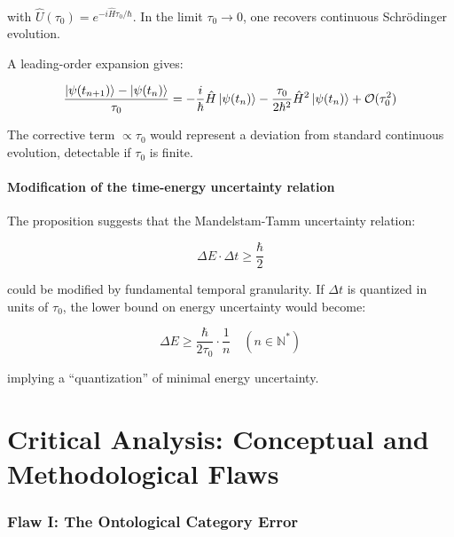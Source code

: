 \documentclass[11pt,a4paper]{article}
\begin{document}
with $\hat{U}(\tau_0) = e^{-i\hat{H}\tau_0/\hbar}$. In the limit $\tau_0 \to 0$, one recovers continuous Schrödinger evolution.

A leading-order expansion gives:

\begin{equation}\label{eq:discrete_expansion}
\frac{\ket{\psi(t_{n+1})} - \ket{\psi(t_n)}}{\tau_0} = -\frac{i}{\hbar}\hat{H}\ket{\psi(t_n)} - \frac{\tau_0}{2\hbar^2}\hat{H}^2\ket{\psi(t_n)} + \mathcal{O}(\tau_0^2)
\end{equation}

The corrective term $\propto \tau_0$ would represent a deviation from standard continuous evolution, detectable if $\tau_0$ is finite.

\subsection{Modification of the time-energy uncertainty relation}

The proposition suggests that the Mandelstam-Tamm uncertainty relation:

\begin{equation}\label{eq:mandelstam_tamm}
\Delta E \cdot \Delta t \geq \frac{\hbar}{2}
\end{equation}

could be modified by fundamental temporal granularity. If $\Delta t$ is quantized in units of $\tau_0$, the lower bound on energy uncertainty would become:

\begin{equation}\label{eq:modified_uncertainty}
\Delta E \geq \frac{\hbar}{2\tau_0} \cdot \frac{1}{n} \quad (n \in \mathbb{N}^*)
\end{equation}

implying a ``quantization'' of minimal energy uncertainty.

\part{Critical Analysis: Conceptual and Methodological Flaws}

\section{Flaw I: The Ontological Category Error}
\end{document}
